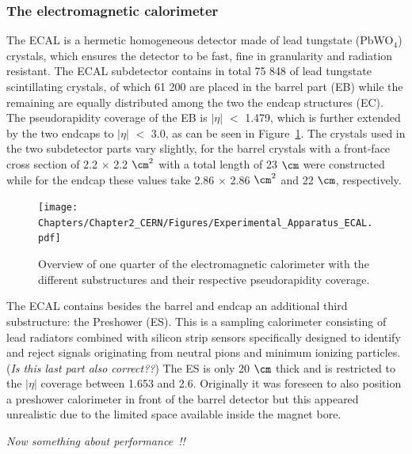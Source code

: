 \subsubsection{The electromagnetic calorimeter}
The ECAL is a hermetic homogeneous detector made of lead tungstate (PbWO$_{4}$) crystals, which ensures the detector to be fast, fine in granularity and radiation resistant. 
The ECAL subdetector contains in total 75 848 of lead tungstate scintillating crystals, of which 
61 200 are placed in the barrel part (EB) while the remaining are equally distributed among the two the endcap structures (EC).%
The pseudorapidity coverage of the EB is $\vert \eta \vert$ $<$ 1.479, which is further extended by the two endcaps to $\vert \eta \vert$ $<$ 3.0, as can be seen in Figure~\ref{fig::ECAL}. The crystals used in the two subdetector parts vary slightly, for the barrel crystals with a front-face cross section of 2.2 $\times$ 2.2 $\cm^{2}$ with a total length of 23 $\cm$ were constructed while for the endcap 
these values take 2.86 $\times$ 2.86 $\cm^{2}$ and 22 $\cm$, respectively.
\begin{figure}[h!t]
 \centering
 \texttt{[image: Chapters/Chapter2\_CERN/Figures/Experimental\_Apparatus\_ECAL.pdf]}
 \caption{Overview of one quarter of the electromagnetic calorimeter with the different substructures and their respective pseudorapidity coverage.} \label{fig::ECAL}
\end{figure}

The ECAL contains besides the barrel and endcap an additional third substructure: the Preshower (ES). This is a sampling calorimeter consisting of lead radiators combined with silicon strip sensors specifically designed to identify and reject signals originating from neutral pions and minimum ionizing particles. (\textit{Is this last part also correct??}) The ES is only 20 $\cm$ thick and is restricted to the $\vert \eta \vert$ coverage between 1.653 and 2.6. 
Originally it was foreseen to also position a preshower calorimeter in front of the barrel detector but this appeared unrealistic due to the limited space available inside the magnet bore.

\textit{Now something about performance~\cite{ECALPerformance}!!}

